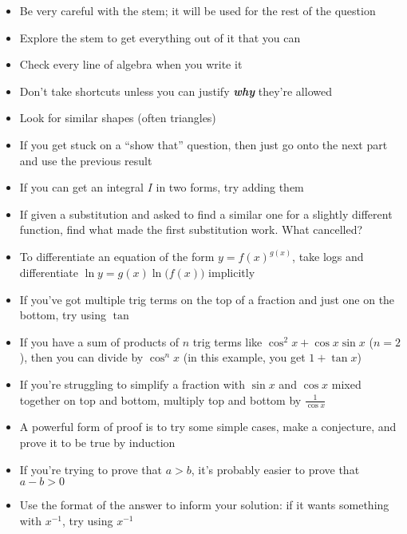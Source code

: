 \documentclass[../main.tex]{subfile}
\begin{document}


\begin{itemize}
	\item Be very careful with the stem; it will be used for the rest of the question
	\item Explore the stem to get everything out of it that you can
	\item Check every line of algebra when you write it
	\item Don't take shortcuts unless you can justify {\Large\textit{\textbf{why}}} they're allowed
	\item Look for similar shapes (often triangles)
	\item If you get stuck on a \enquote{show that} question, then just go onto the next part and use the previous result
\end{itemize}


\begin{itemize}
	\item If you can get an integral $I$ in two forms, try adding them
	\item If given a substitution and asked to find a similar one for a slightly different function, find what made the first substitution work. What cancelled?
	\item To differentiate an equation of the form $y = f(x)^{g(x)}$, take logs and differentiate $\ln y = g(x) \ln\big(f(x)\big)$ implicitly
\end{itemize}


\begin{itemize}
	\item If you've got multiple trig terms on the top of a fraction and just one on the bottom, try using $\tan$
	\item If you have a sum of products of $n$ trig terms like $\cos^2 x + \cos x\sin x$ ($n = 2$), then you can divide by $\cos^n x$ (in this example, you get $1 + \tan x$)
	\item If you're struggling to simplify a fraction with $\sin x$ and $\cos x$ mixed together on top and bottom, multiply top and bottom by $\frac{1}{\cos x}$
\end{itemize}


\begin{itemize}
	\item A powerful form of proof is to try some simple cases, make a conjecture, and prove it to be true by induction
	\item If you're trying to prove that $a > b$, it's probably easier to prove that $a - b > 0$
	\item Use the format of the answer to inform your solution: if it wants something with $x^{-1}$, try using $x^{-1}$
\end{itemize}
\end{document}
